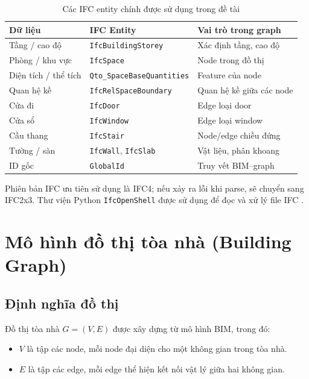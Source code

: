 \begin{table}[H]
\centering
\caption{Các IFC entity chính được sử dụng trong đề tài}
\label{tab:ifc_entities}
\begin{tabularx}{\textwidth}{l l X}
\toprule
\textbf{Dữ liệu} & \textbf{IFC Entity} & \textbf{Vai trò trong graph} \\
\midrule
Tầng / cao độ     & \texttt{IfcBuildingStorey}     & Xác định tầng, cao độ \\
Phòng / khu vực   & \texttt{IfcSpace}              & Node trong đồ thị \\
Diện tích / thể tích & \texttt{Qto\_SpaceBaseQuantities} & Feature của node \\
Quan hệ kề        & \texttt{IfcRelSpaceBoundary}   & Quan hệ kề giữa các node \\
Cửa đi            & \texttt{IfcDoor}               & Edge loại door \\
Cửa sổ            & \texttt{IfcWindow}             & Edge loại window \\
Cầu thang         & \texttt{IfcStair}              & Node/edge chiều đứng \\
Tường / sàn       & \texttt{IfcWall}, \texttt{IfcSlab} & Vật liệu, phân khoang \\
ID gốc            & \texttt{GlobalId}              & Truy vết BIM--graph \\
\bottomrule
\end{tabularx}
\end{table}

Phiên bản IFC ưu tiên sử dụng là IFC4; nếu xảy ra lỗi khi parse, sẽ chuyển sang IFC2x3. Thư viện Python \texttt{IfcOpenShell} được sử dụng để đọc và xử lý file IFC \cite{ifcopenshell}.

\section{Mô hình đồ thị tòa nhà (Building Graph)}
\label{sec:buildinggraph}

\subsection{Định nghĩa đồ thị}

Đồ thị tòa nhà $G = (V, E)$ được xây dựng từ mô hình BIM, trong đó:
\begin{itemize}
  \item $V$ là tập các node, mỗi node đại diện cho một không gian trong tòa nhà.
  \item $E$ là tập các edge, mỗi edge thể hiện kết nối vật lý giữa hai không gian.
\end{itemize}

